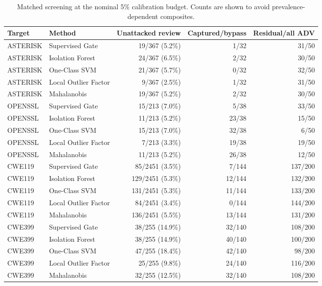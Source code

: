 \begin{table}[t]
\centering
\caption{Matched screening at the nominal 5\% calibration budget. Counts are shown to avoid prevalence-dependent composites.}
\label{tab:matched-five}
\scriptsize
\begin{tabular}{llrrr}
\toprule
Target & Method & Unattacked review & Captured/bypass & Residual/all ADV \\ 
\midrule
ASTERISK & Supervised Gate & 19/367 (5.2\%) & 1/32 & 31/50 \\
ASTERISK & Isolation Forest & 24/367 (6.5\%) & 2/32 & 30/50 \\
ASTERISK & One-Class SVM & 21/367 (5.7\%) & 0/32 & 32/50 \\
ASTERISK & Local Outlier Factor & 9/367 (2.5\%) & 1/32 & 31/50 \\
ASTERISK & Mahalanobis & 19/367 (5.2\%) & 2/32 & 30/50 \\
OPENSSL & Supervised Gate & 15/213 (7.0\%) & 5/38 & 33/50 \\
OPENSSL & Isolation Forest & 11/213 (5.2\%) & 23/38 & 15/50 \\
OPENSSL & One-Class SVM & 15/213 (7.0\%) & 32/38 & 6/50 \\
OPENSSL & Local Outlier Factor & 7/213 (3.3\%) & 19/38 & 19/50 \\
OPENSSL & Mahalanobis & 11/213 (5.2\%) & 26/38 & 12/50 \\
CWE119 & Supervised Gate & 85/2451 (3.5\%) & 7/144 & 137/200 \\
CWE119 & Isolation Forest & 129/2451 (5.3\%) & 12/144 & 132/200 \\
CWE119 & One-Class SVM & 131/2451 (5.3\%) & 11/144 & 133/200 \\
CWE119 & Local Outlier Factor & 84/2451 (3.4\%) & 0/144 & 144/200 \\
CWE119 & Mahalanobis & 136/2451 (5.5\%) & 13/144 & 131/200 \\
CWE399 & Supervised Gate & 38/255 (14.9\%) & 32/140 & 108/200 \\
CWE399 & Isolation Forest & 38/255 (14.9\%) & 40/140 & 100/200 \\
CWE399 & One-Class SVM & 47/255 (18.4\%) & 42/140 & 98/200 \\
CWE399 & Local Outlier Factor & 25/255 (9.8\%) & 24/140 & 116/200 \\
CWE399 & Mahalanobis & 32/255 (12.5\%) & 32/140 & 108/200 \\
\bottomrule
\end{tabular}
\end{table}
